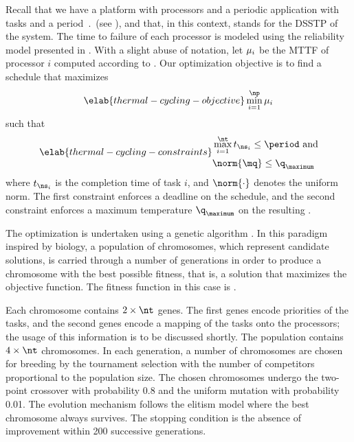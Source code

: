 Recall that we have a platform with \np processors and a periodic application
with \nt tasks and a period $\period$ (see ), and that, in
this context, \mq stands for the \ac{DSSTP} of the system. The time to failure
of each processor is modeled using the reliability model presented in
. With a slight abuse of notation, let $\mu_i$ be the
\ac{MTTF} of processor $i$ computed according to .
Our optimization objective is to find a schedule that maximizes
\begin{equation} \elab{thermal-cycling-objective}
  \min_{i = 1}^\np \mean_i
\end{equation}
such that
\begin{align} \elab{thermal-cycling-constraints}
  \begin{split}
    & \max_{i = 1}^\nt t_{\ns_i} \leq \period \text{ and} \\
    & \norm{\mq} \leq \q_\maximum
  \end{split}
\end{align}
where $t_{\ns_i}$ is the completion time of task $i$, and $\norm{\cdot}$ denotes
the uniform norm. The first constraint enforces a deadline on the schedule, and
the second constraint enforces a maximum temperature $\q_\maximum$ on the
resulting \mq.

The optimization is undertaken using a genetic algorithm \cite{schmitz2004}. In
this paradigm inspired by biology, a population of chromosomes, which represent
candidate solutions, is carried through a number of generations in order to
produce a chromosome with the best possible fitness, that is, a solution that
maximizes the objective function. The fitness function in this case is
.

Each chromosome contains $2 \times \nt$ genes. The first \nt genes encode
priorities of the tasks, and the second \nt genes encode a mapping of the tasks
onto the processors; the usage of this information is to be discussed shortly.
The population contains $4 \times \nt$ chromosomes. In each generation, a number
of chromosomes are chosen for breeding by the tournament selection with the
number of competitors proportional to the population size. The chosen
chromosomes undergo the two-point crossover with probability 0.8 and the uniform
mutation with probability 0.01. The evolution mechanism follows the elitism
model where the best chromosome always survives. The stopping condition is the
absence of improvement within 200 successive generations.

